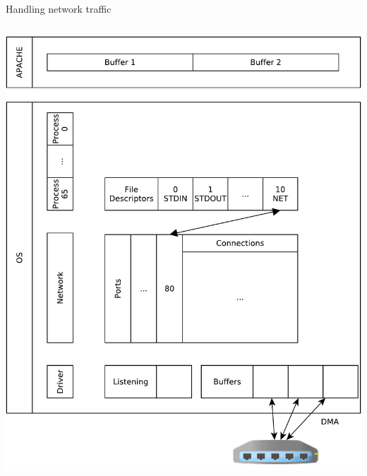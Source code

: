 \documentclass{beamer}
\begin{document}
\begin{frame}[fragile]{Handling network traffic}
\begin{columns}
\begin{column}[t]{0.5\textwidth}
\begin{center}
{  \includegraphics[width=1\linewidth]{sock_mem_2}
     }
\end{center}
\end{column}
\end{columns}
\end{frame}
   
\end{document}
